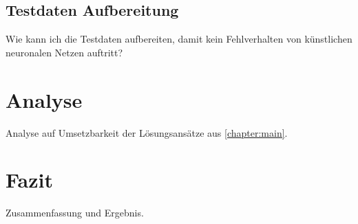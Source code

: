 \documentclass[12pt,oneside,a4paper,parskip]{scrbook}
\begin{document}
\section{Testdaten Aufbereitung}
Wie kann ich die Testdaten aufbereiten, damit kein Fehlverhalten von künstlichen neuronalen Netzen auftritt?

\chapter{Analyse}
Analyse auf Umsetzbarkeit der Lösungsansätze aus \ref{chapter:main}.

\chapter{Fazit}
Zusammenfassung und Ergebnis.



\backmatter
\listoftables


\cleardoublepage
{}
{}
\printbibliography
\end{document}
